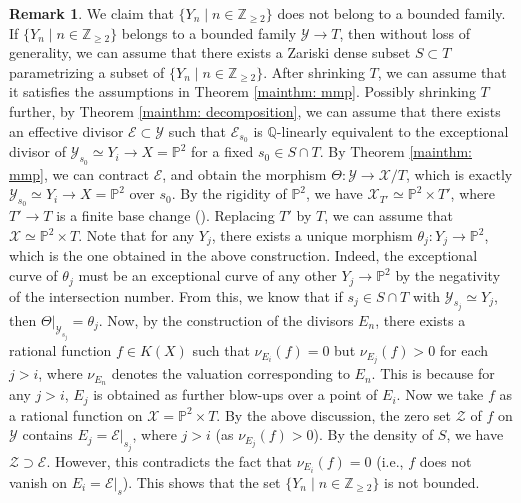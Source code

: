 \documentclass[11pt,oneside,reqno]{amsart}
\numberwithin{equation}{section}
\theoremstyle{definition}
\newtheorem{remark}[proposition]{Remark}
\newcommand{\bP}{\mathbb{P}}
\newcommand{\bQ}{\mathbb{Q}}
\newcommand{\bZ}{\mathbb{Z}}
\newcommand{\mX}{\mathcal{X}}
\newcommand{\mY}{\mathcal{Y}}
\begin{document}
\begin{remark}
  
  We claim that $\{Y_n\mid n \in \bZ_{\geq 2}\}$ does not belong to a bounded family. If $\{Y_n\mid n \in \bZ_{\geq 2}\}$ belongs to a bounded family $\mY \to T$, then without loss of generality, we can assume that there exists a Zariski dense subset $S \subset T$ parametrizing a subset of $\{Y_n\mid n \in \bZ_{\geq 2}\}$. After shrinking $T$, we can assume that it satisfies the assumptions in Theorem \ref{mainthm: mmp}. Possibly shrinking $T$ further, by Theorem \ref{mainthm: decomposition}, we can assume that there exists an effective divisor $\mathcal E\subset\mY$ such that $\mathcal E_{s_0}$ is $\bQ$-linearly equivalent to the exceptional divisor of $\mY_{s_0} \simeq Y_i \to X=\bP^2$ for a fixed $s_0\in S\cap T$. By Theorem \ref{mainthm: mmp}, we can contract $\mathcal E$, and obtain the morphism $\Theta: \mY \to \mX/T$, which is exactly $\mY_{s_0} \simeq Y_i \to X=\bP^2$ over $s_0$. By the rigidity of $\bP^2$, we have $\mX_{T'} \simeq \bP^2 \times T'$, where $T' \to T$ is a finite base change (\cite[Example 5.3.1, Exercise 24.7(c)]{Har10}). Replacing $T'$ by $T$, we can assume that $\mX \simeq \bP^2 \times T$. Note that for any $Y_j$, there exists a unique morphism $\theta_j: Y_j \to \bP^2$, which is the one obtained in the above construction. Indeed, the exceptional curve of $\theta_j$ must be an exceptional curve of any other $Y_j \to \bP^2$ by the negativity of the intersection number. From this, we know that if $s_j\in S \cap T$ with $\mY_{s_j} \simeq Y_j$, then $\Theta|_{\mY_{s_j}} = \theta_j$. Now, by the construction of the divisors $E_n$, there exists a rational function $f\in K(X)$ such that $\nu_{E_i}(f)=0$ but $\nu_{E_j}(f)>0$ for each $j>i$, where $\nu_{E_n}$ denotes the valuation corresponding to $E_n$. This is because for any $j>i$, $E_j$ is obtained as further blow-ups over a point of $E_i$. Now we take $f$ as a rational function on $\mX = \bP^2 \times T$. By the above discussion, the zero set $\mathcal Z$ of $f$ on $\mY$ contains $E_j = \mathcal E|_{s_j}$, where $j>i$ (as $\nu_{E_j}(f)>0$). By the density of $S$, we have $\mathcal Z \supset \mathcal E$. However, this contradicts the fact that $\nu_{E_i}(f) =0$ (i.e., $f$ does not vanish on $E_i = \mathcal E|_s$). This shows that the set $\{Y_n\mid n \in \bZ_{\geq 2}\}$ is not bounded.
\end{remark}





\end{document}
